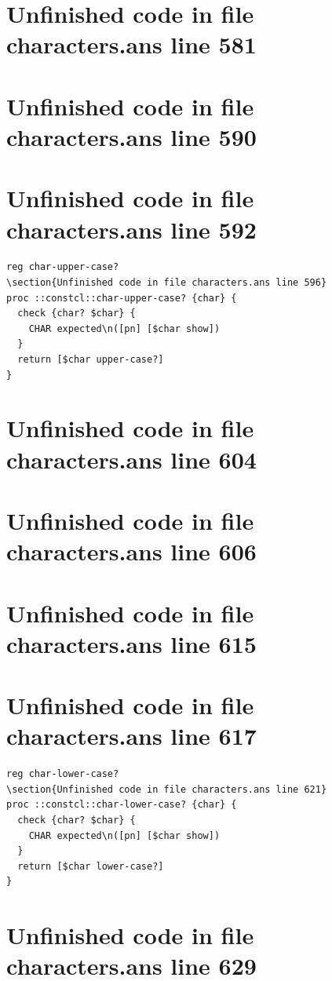 \documentclass[twoside,9pt]{report}
\begin{document}
\section{Unfinished code in file characters.ans line 581}
\section{Unfinished code in file characters.ans line 590}
\section{Unfinished code in file characters.ans line 592}
\begin{lstlisting}
reg char-upper-case?
\section{Unfinished code in file characters.ans line 596}
proc ::constcl::char-upper-case? {char} {
  check {char? $char} {
    CHAR expected\n([pn] [$char show])
  }
  return [$char upper-case?]
}
\end{lstlisting}
\section{Unfinished code in file characters.ans line 604}
\section{Unfinished code in file characters.ans line 606}
\section{Unfinished code in file characters.ans line 615}
\section{Unfinished code in file characters.ans line 617}
\begin{lstlisting}
reg char-lower-case?
\section{Unfinished code in file characters.ans line 621}
proc ::constcl::char-lower-case? {char} {
  check {char? $char} {
    CHAR expected\n([pn] [$char show])
  }
  return [$char lower-case?]
}
\end{lstlisting}
\section{Unfinished code in file characters.ans line 629}
\end{document}
